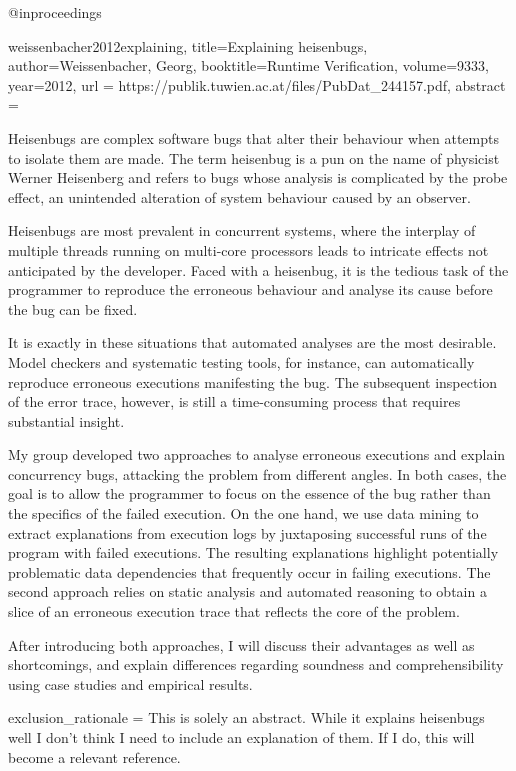 @inproceedings{weissenbacher2012explaining,
  title={Explaining heisenbugs},
  author={Weissenbacher, Georg},
  booktitle={Runtime Verification},
  volume={9333},
  year={2012},
  url = {https://publik.tuwien.ac.at/files/PubDat_244157.pdf},
  abstract = {
    Heisenbugs are complex software bugs that alter their behaviour when attempts to isolate them are made. The term heisenbug is a pun on the name of physicist Werner Heisenberg and refers to bugs whose analysis is complicated by the probe effect, an unintended alteration of system behaviour caused by an observer.

    Heisenbugs are most prevalent in concurrent systems, where the interplay of multiple threads running on multi-core processors leads to intricate effects not anticipated by the developer. Faced with a heisenbug, it is the tedious task of the programmer to reproduce the erroneous behaviour and analyse its cause before the bug can be fixed.

    It is exactly in these situations that automated analyses are the most desirable. Model checkers and systematic testing tools, for instance, can automatically reproduce erroneous executions manifesting the bug. The subsequent inspection of the error trace, however, is still a time-consuming process that requires substantial insight. 

    My group developed two approaches to analyse erroneous executions and explain concurrency bugs, attacking the problem from different angles. In both cases, the goal is to allow the programmer to focus on the essence of the bug rather than the specifics of the failed execution. On the one hand, we use data mining to extract explanations from execution logs by juxtaposing successful runs of the program with failed executions. The resulting explanations highlight potentially problematic data dependencies that frequently occur in failing executions. The second approach relies on static analysis and automated reasoning to obtain a slice of an erroneous execution trace that reflects the core of the problem.

    After introducing both approaches, I will discuss their advantages as well as shortcomings, and explain differences regarding soundness and comprehensibility using case studies and empirical results.
  }
  exclusion_rationale = {This is solely an abstract. While it explains heisenbugs well I don't think I need to include an explanation of them. If I do, this will become a relevant reference.}
}

